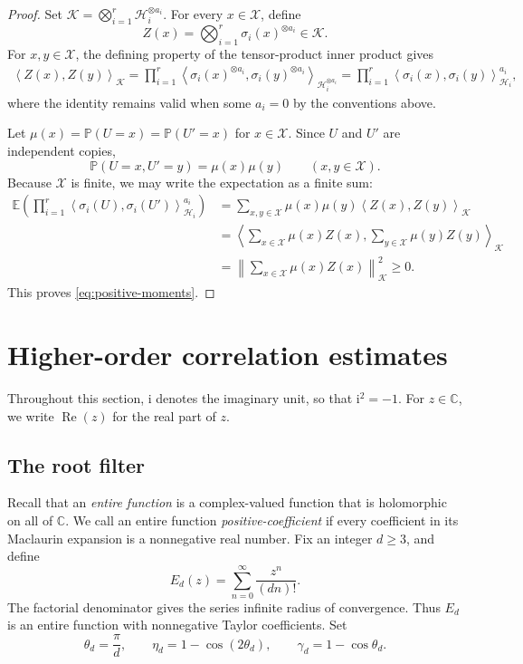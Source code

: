 \documentclass[twoside,12pt]{article}
\theoremstyle{definition}
\theoremstyle{remark}
\newcommand{\norm}[1]{\left\lVert #1\right\rVert}
\newcommand{\E}{\mathbb E}
\newcommand{\Pp}{\mathbb P}
\newcommand{\C}{\mathbb C}
\newcommand{\1}{\mathbf 1}
\newcommand{\ip}[2]{\left\langle #1,#2\right\rangle}
\newcommand{\tensor}{\otimes}
\begin{document}
\begin{proof}
Set
$
 \mathcal K=\bigotimes_{i=1}^r\mathcal H_i^{\tensor a_i}.
$
For every $x\in\mathcal X$, define
\[
Z(x)=\bigotimes_{i=1}^r\sigma_i(x)^{\tensor a_i}\in\mathcal K.
\]
For $x,y\in\mathcal X$, the defining property of the tensor-product inner
product gives
\begin{align*}
 \ip{Z(x)}{Z(y)}_{\mathcal K}
 =\prod_{i=1}^r
 \ip{\sigma_i(x)^{\tensor a_i}}{\sigma_i(y)^{\tensor a_i}}_{\mathcal H_i^{\tensor a_i}}=\prod_{i=1}^r
 \ip{\sigma_i(x)}{\sigma_i(y)}_{\mathcal H_i}^{a_i},
\end{align*}
where the identity remains valid when some $a_i=0$ by the conventions above.

Let $\mu(x)=\Pp(U=x)=\Pp(U'=x)$ for $x\in\mathcal X$. Since $U$ and $U'$
are independent copies,
\[
 \Pp(U=x,U'=y)=\mu(x)\mu(y)
 \qquad(x,y\in\mathcal X).
\]
Because $\mathcal X$ is finite, we may write the expectation as a finite sum:
\begin{align*}
 \E\left(\prod_{i=1}^r
 \ip{\sigma_i(U)}{\sigma_i(U')}_{\mathcal H_i}^{a_i}\right)
 &=\sum_{x,y\in\mathcal X}\mu(x)\mu(y)\ip{Z(x)}{Z(y)}_{\mathcal K}\\
 &=\ip{\sum_{x\in\mathcal X}\mu(x)Z(x)}
 {\sum_{y\in\mathcal X}\mu(y)Z(y)}_{\mathcal K}\\
 &=\norm{\sum_{x\in\mathcal X}\mu(x)Z(x)}_{\mathcal K}^{2}\ge0.
\end{align*}
This proves \eqref{eq:positive-moments}.
\end{proof}

\section{Higher-order correlation estimates}\label{sec:analytic}

Throughout this section, $\mathrm i$ denotes the imaginary unit, so that
$\mathrm i^2=-1$. For $z\in\C$, we write $\operatorname{Re}(z)$ for the
real part of $z$.

\subsection{The root filter}\label{sec:filters}

Recall that an \emph{entire function} is a complex-valued function that is
holomorphic on all of $\C$. We call an entire function
\emph{positive-coefficient} if every coefficient in its Maclaurin expansion
is a nonnegative real number. Fix an integer $d\ge3$, and define
\[
 E_d(z)=\sum_{n=0}^{\infty}\frac{z^n}{(dn)!}.
\]
The factorial denominator gives the series infinite radius of convergence.
Thus $E_d$ is an entire function with nonnegative Taylor coefficients. Set
\[
 \theta_d=\frac{\pi}{d},
 \qquad
 \eta_d=1-\cos(2\theta_d),
 \qquad
 \gamma_d=1-\cos\theta_d.
\]
\end{document}
